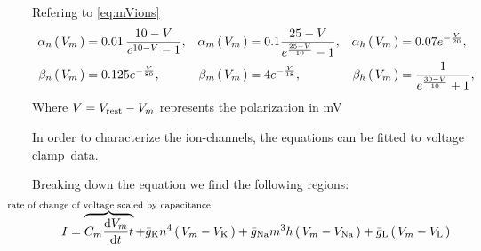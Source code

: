 \documentclass[../../Orator.tex]{subfiles}
\begin{document}
Refering to \cref{eq:mVions}
\begin{align*}
    \alpha_n \br{V_m} &= 0.01 \, \frac{ 10 - V }{ e^{ 10 - V } - 1}, &
    \alpha_m \br{V_m} &= 0.1 \frac{ 25 - V }{e^{\frac{25-V}{10}} - 1}, &
    \alpha_h \br{V_m} &=  0.07 e^{-\frac{V}{20}}, \\
    \beta_n \br{V_m}  &= 0.125 e^{- \frac{V}{80}}, &
    \beta_m \br{V_m}  &= 4 e^{- \frac{V}{18}}, &
    \beta_h \br{V_m}  &= \frac{ 1 }{ e^{\frac{30 - V}{10}} + 1},
\end{align*}
Where \(V = V_{\mathrm{rest}} - V_m\) represents the polarization in \unit{\milli\volt}

In order to characterize the ion-channels, the equations can be fitted to voltage clamp\footnotemark~data.


Breaking down the equation we find the following regions:
\begin{equation*}
    I = 
    \overbrace{C_m \ode{V_m}{t}}^{\mathclap{\text{rate of change of voltage scaled by capacitance}}} + 
    \bar{g}_\rmm{K} n^4 \br{V_m - V_\rmm{K}} + 
    \bar{g}_\rmm{Na} m^3 h \br{V_m - V_\rmm{Na}}  + 
    \bar{g}_\rmm{L} \br{V_m - V_\rmm{L}} 
\end{equation*}
\end{document}
